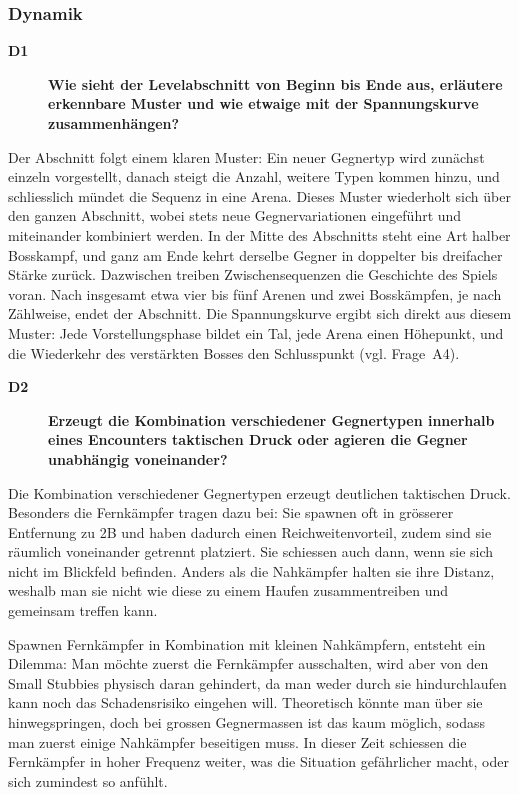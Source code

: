 \documentclass[../Main.tex]{subfiles}
\begin{document}
\subsubsection{Dynamik}

\begin{description}
    \item[\textbf{D1}] \textbf{Wie sieht der Levelabschnitt von Beginn bis Ende aus, erläutere erkennbare Muster und wie etwaige mit der Spannungskurve zusammenhängen?}
\end{description}

Der Abschnitt folgt einem klaren Muster: Ein neuer Gegnertyp wird zunächst einzeln vorgestellt, danach steigt die Anzahl, weitere Typen kommen hinzu, und schliesslich mündet die Sequenz in eine Arena. Dieses Muster wiederholt sich über den ganzen Abschnitt, wobei stets neue Gegnervariationen eingeführt und miteinander kombiniert werden. In der Mitte des Abschnitts steht eine Art halber Bosskampf, und ganz am Ende kehrt derselbe Gegner in doppelter bis dreifacher Stärke zurück. Dazwischen treiben Zwischensequenzen die Geschichte des Spiels voran. Nach insgesamt etwa vier bis fünf Arenen und zwei Bosskämpfen, je nach Zählweise, endet der Abschnitt. Die Spannungskurve ergibt sich direkt aus diesem Muster: Jede Vorstellungsphase bildet ein Tal, jede Arena einen Höhepunkt, und die Wiederkehr des verstärkten Bosses den Schlusspunkt (vgl. Frage~A4).

\begin{description}
    \item[\textbf{D2}] \textbf{Erzeugt die Kombination verschiedener Gegnertypen innerhalb eines Encounters taktischen Druck oder agieren die Gegner unabhängig voneinander?}
\end{description}

Die Kombination verschiedener Gegnertypen erzeugt deutlichen taktischen Druck. Besonders die Fernkämpfer tragen dazu bei: Sie spawnen oft in grösserer Entfernung zu 2B und haben dadurch einen Reichweitenvorteil, zudem sind sie räumlich voneinander getrennt platziert. Sie schiessen auch dann, wenn sie sich nicht im Blickfeld befinden. Anders als die Nahkämpfer halten sie ihre Distanz, weshalb man sie nicht wie diese zu einem Haufen zusammentreiben und gemeinsam treffen kann.

Spawnen Fernkämpfer in Kombination mit kleinen Nahkämpfern, entsteht ein Dilemma: Man möchte zuerst die Fernkämpfer ausschalten, wird aber von den Small Stubbies physisch daran gehindert, da man weder durch sie hindurchlaufen kann noch das Schadensrisiko eingehen will. Theoretisch könnte man über sie hinwegspringen, doch bei grossen Gegnermassen ist das kaum möglich, sodass man zuerst einige Nahkämpfer beseitigen muss. In dieser Zeit schiessen die Fernkämpfer in hoher Frequenz weiter, was die Situation gefährlicher macht, oder sich zumindest so anfühlt.
\end{document}
